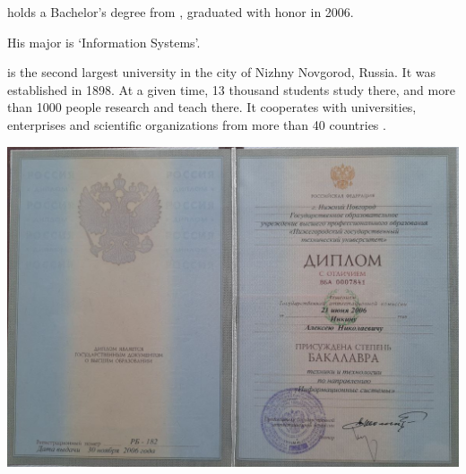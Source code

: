 
\mrl holds a Bachelor's degree from \Nntu,
graduated with honor in 2006.

His major is `Information Systems'.

\Nntu is the second largest university in the city of Nizhny Novgorod, Russia.
It was established in 1898.
At a given time, 13 thousand students study there, and more than 1000 people research and teach there.
It cooperates with universities, enterprises and scientific organizations from more than 40 countries
.



\begin{center}
    \includegraphics[width=57em,angle=90]{title}
\end{center}
\pagebreak

